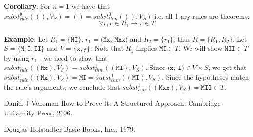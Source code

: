 \documentclass{article}
\begin{document}
\textbf{Corollary}: For $n = 1$ we have that $subst_{rule}^0((), V_S) = () = subst_{thm}^0((), V_S)$ i.e. all 1-ary rules are theorems:
$$\forall r, r \in R_1 \to r \in T$$

\textbf{Example}: Let $R_1 = \{ \texttt{MI} \}$, $r_1 = \texttt{(Mx, Mxx)}$ and $R_2 = \{ r_1 \}$; thus $R = \{ R_1, R_2 \}$. Let $S = \{ \texttt{M}, \texttt{I}, \texttt{II} \}$ and $V = \{ \texttt{x}, \texttt{y} \}$. Note that $R_1$ implies $\texttt{MI} \in T$. We will show $\texttt{MII} \in T$ by using $r_1$ - we need to show that $subst_{rule}^1((\texttt{Mx}), V_S) = subst_{thm}^1((\texttt{MI}), V_S)$. Since $\texttt{(x, I)} \in V \times S$, we get that $subst_{rule}^1((\texttt{Mx}), V_S) = \texttt{MI} = subst_{thm}^1((\texttt{MI}), V_S)$. Since the hypotheses match the rule's arguments, we conclude that $subst_{rule}^1((\texttt{Mxx}), V_S) = \texttt{MII} \in T$.

\begin{thebibliography}{1}

Daniel J Velleman
\newblock How to Prove It: A Structured Approach.
\newblock Cambridge University Press, 2006.

Douglas Hofstadter
\newblock Basic Books, Inc., 1979.

\end{thebibliography}
\end{document}
